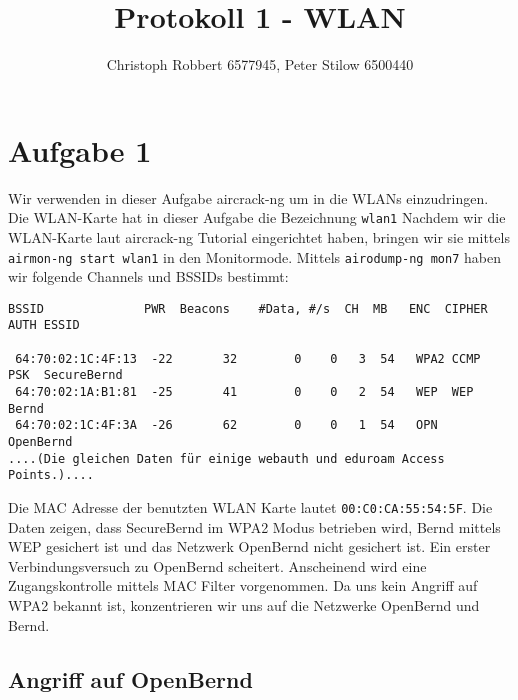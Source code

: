 \documentclass[10pt,a4paper]{article}
\author{Christoph Robbert 6577945, Peter Stilow 6500440}
\title{Protokoll 1 - WLAN}
\begin{document}
\maketitle
 
\section{Aufgabe 1}

Wir verwenden in dieser Aufgabe aircrack-ng um in die WLANs einzudringen. Die WLAN-Karte hat in dieser Aufgabe die Bezeichnung \texttt{wlan1}
Nachdem wir die WLAN-Karte laut aircrack-ng Tutorial eingerichtet haben, bringen wir sie mittels
\texttt{airmon-ng start wlan1} in den Monitormode. Mittels \texttt{airodump-ng mon7} haben wir folgende Channels und BSSIDs bestimmt:
\begin{verbatim}
BSSID              PWR  Beacons    #Data, #/s  CH  MB   ENC  CIPHER AUTH ESSID                                                                                                 
                                                                                                                                                                                
 64:70:02:1C:4F:13  -22       32        0    0   3  54   WPA2 CCMP   PSK  SecureBernd                                                                                           
 64:70:02:1A:B1:81  -25       41        0    0   2  54   WEP  WEP         Bernd                                                                                                 
 64:70:02:1C:4F:3A  -26       62        0    0   1  54   OPN              OpenBernd                                                                                             
....(Die gleichen Daten für einige webauth und eduroam Access Points.)....
\end{verbatim}
Die MAC Adresse der benutzten WLAN Karte lautet \texttt{00:C0:CA:55:54:5F}.
Die Daten zeigen, dass SecureBernd im WPA2 Modus betrieben wird, Bernd mittels WEP gesichert ist und das Netzwerk OpenBernd nicht gesichert ist. Ein erster Verbindungsversuch zu OpenBernd scheitert. Anscheinend wird eine Zugangskontrolle mittels MAC Filter vorgenommen. Da uns kein Angriff auf WPA2 bekannt ist, konzentrieren wir uns auf die Netzwerke OpenBernd und Bernd.

\subsection{Angriff auf OpenBernd}
\end{document}
